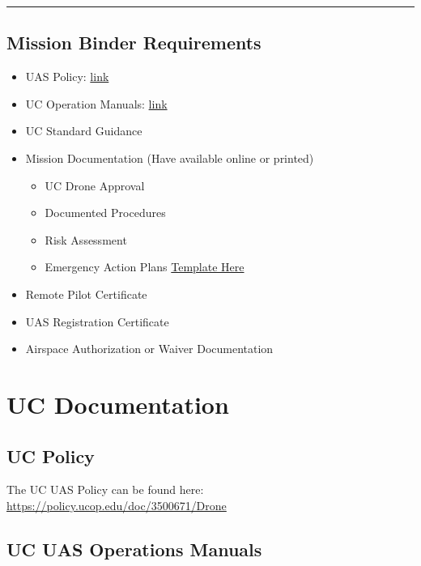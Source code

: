 \documentclass[
]{book}
\providecommand{\tightlist}{%
  \setlength{\itemsep}{0pt}\setlength{\parskip}{0pt}}
\begin{document}
\begin{center}\rule{0.5\linewidth}{0.5pt}\end{center}

\hypertarget{mission-binder-requirements}{%
\section*{Mission Binder Requirements}\label{mission-binder-requirements}}

\begin{itemize}
\tightlist
\item
  UAS Policy: \href{https://policy.ucop.edu/doc/3500671/Drone}{link}
\item
  UC Operation Manuals: \href{https://ucdrones.github.io/ch-user-guides.html}{link}
\item
  UC Standard Guidance
\item
  Mission Documentation (Have available online or printed)

  \begin{itemize}
  \tightlist
  \item
    UC Drone Approval
  \item
    Documented Procedures
  \item
    Risk Assessment
  \item
    Emergency Action Plans \href{http://ucdrones.github.io/library/emergency_procedure_checklists.docx}{Template Here}
  \end{itemize}
\item
  Remote Pilot Certificate
\item
  UAS Registration Certificate
\item
  Airspace Authorization or Waiver Documentation
\end{itemize}

\hypertarget{ch-docs}{%
\chapter{UC Documentation}\label{ch-docs}}

\hypertarget{uc-policy}{%
\section{UC Policy}\label{uc-policy}}

The UC UAS Policy can be found here: \url{https://policy.ucop.edu/doc/3500671/Drone}

\hypertarget{uc-uas-operations-manuals}{%
\section{UC UAS Operations Manuals}\label{uc-uas-operations-manuals}}
\end{document}
